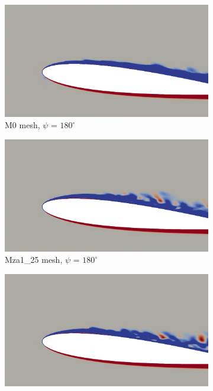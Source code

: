 \begin{figure}[H]
	\centering
	\begin{center}
	\begin{subfigure}[b]{0.475\textwidth}
		\centering
		\includegraphics[width=1\textwidth]{figures/zonal_adapt_results/vorticity_plots/v2/M0/spavg/phase_180.png}
		\caption{M0 mesh, $\psi$ = $180^\circ$}
		\label{fig:M0_sp_psi180}
	\end{subfigure}
	\end{center}
	\begin{subfigure}[b]{0.475\textwidth}
	\centering
	\includegraphics[width=1\textwidth]{figures/zonal_adapt_results/vorticity_plots/v2/Mza1_25/spavg/phase_180.png}
	\caption{Mza1\_25 mesh, $\psi$ = $180^\circ$}
	\label{fig:Mza1_25_sp_psi180}
\end{subfigure}
	\begin{subfigure}[b]{0.475\textwidth}
		\centering
		\includegraphics[width=1\textwidth]{figures/zonal_adapt_results/vorticity_plots/v2/Mza1_50/spavg/phase_180.png}

\end{subfigure}
\end{figure}
